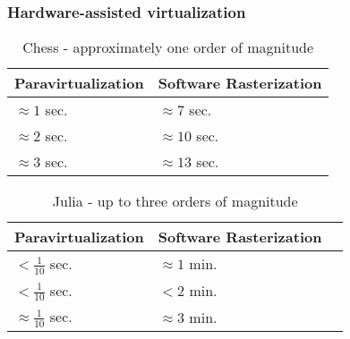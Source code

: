 \begin{frame}
\frametitle{Hardware-assisted virtualization}

\begin{table}[]
\centering
\caption{Chess - approximately one order of magnitude}
\begin{tabular}{ll}
\hline
Paravirtualization & Software Rasterization \\ \hline
$\approx 1$ sec. & $\approx 7$ sec. \\
$\approx 2$ sec. & $\approx 10$ sec. \\
$\approx 3$ sec. & $\approx 13$ sec. \\ \hline
\end{tabular}
\end{table}

\begin{table}[]
\centering
\caption{Julia - up to three orders of magnitude}
\begin{tabular}{lll}
\hline
Paravirtualization & Software Rasterization \\ \hline
$<\frac{1}{10}$ sec. & $\approx 1$ min. \\
$<\frac{1}{10}$ sec. & $<2$ min. \\
$\approx \frac{1}{10}$ sec. & $\approx 3$ min. \\ \hline
\end{tabular}
\end{table}


\end{frame}
